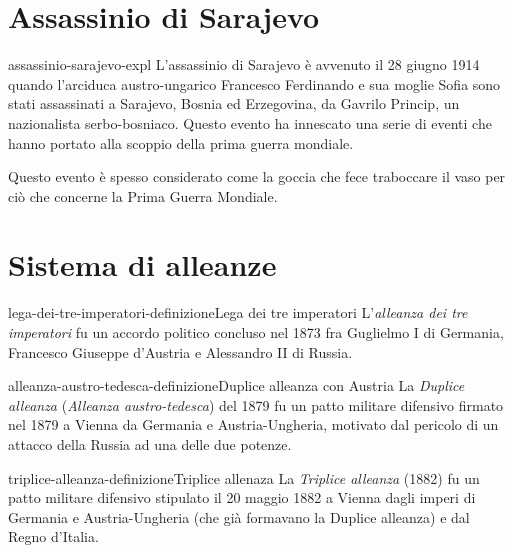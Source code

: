 \documentclass[preview]{standalone}
\begin{document}
\section{Assassinio di Sarajevo}

\begin{snippet}{assassinio-sarajevo-expl}
    L'assassinio di Sarajevo è avvenuto il 28 giugno 1914
    quando l'arciduca austro-ungarico Francesco Ferdinando e
    sua moglie Sofia sono stati assassinati a Sarajevo,
    Bosnia ed Erzegovina, da Gavrilo Princip,
    un nazionalista serbo-bosniaco.
    Questo evento ha innescato una serie di eventi che hanno portato alla
    scoppio della prima guerra mondiale.

    Questo evento è spesso considerato come la goccia che fece traboccare il vaso
    per ciò che concerne la Prima Guerra Mondiale.
\end{snippet}

\section{Sistema di alleanze}

\begin{snippetdefinition}{lega-dei-tre-imperatori-definizione}{Lega dei tre imperatori}
    L'\textit{alleanza dei tre imperatori}
    fu un accordo politico concluso nel
    1873 fra Guglielmo I di Germania, Francesco Giuseppe d'Austria e Alessandro II di Russia.
\end{snippetdefinition}


\begin{snippetdefinition}{alleanza-austro-tedesca-definizione}{Duplice alleanza con Austria}
    La \textit{Duplice alleanza} (\textit{Alleanza austro-tedesca})
    del 1879 fu un patto militare difensivo firmato nel 1879 a Vienna da Germania
    e Austria-Ungheria, motivato dal pericolo di un attacco della Russia ad una delle due potenze.
\end{snippetdefinition}

\begin{snippetdefinition}{triplice-alleanza-definizione}{Triplice allenaza}
    La \textit{Triplice alleanza} (1882)
    fu un patto militare difensivo stipulato il 20 maggio 1882 a
    Vienna dagli imperi di Germania e Austria-Ungheria
    (che già formavano la Duplice alleanza) e dal Regno d'Italia. 
\end{snippetdefinition}
\end{document}
